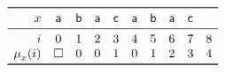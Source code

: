 \documentclass[10pt]{article}
\begin{document}
\TeXtoEPS
\(
\begin{array}{rcccccccccc}
\toprule
  x 
& \word{a} & \word{b} & \word{a} & \word{c} 
& \word{a} & \word{b} & \word{a} & \word{c}
& \\
\midrule
  i
& 0 & 1 & 2 & 3 & 4 & 5 & 6 & 7 & 8\\
  \MPfailure{x}{}{i}
& \Box & 0 & 0 & 1 & 0 & 1 & 2 & 3 & 4\\
\bottomrule
\end{array}
\)
\endTeXtoEPS
\end{document}
